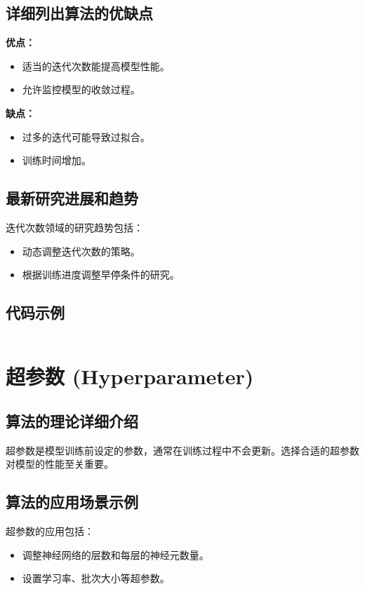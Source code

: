 \subsection*{详细列出算法的优缺点}
\textbf{优点：}
\begin{itemize}
    \item 适当的迭代次数能提高模型性能。
    \item 允许监控模型的收敛过程。
\end{itemize}

\textbf{缺点：}
\begin{itemize}
    \item 过多的迭代可能导致过拟合。
    \item 训练时间增加。
\end{itemize}

\subsection*{最新研究进展和趋势}
迭代次数领域的研究趋势包括：
\begin{itemize}
    \item 动态调整迭代次数的策略。
    \item 根据训练进度调整早停条件的研究。
\end{itemize}
\subsection*{代码示例}
\begin{lstlisting}

\end{lstlisting}


\section{超参数 (Hyperparameter)}
\subsection*{算法的理论详细介绍}
超参数是模型训练前设定的参数，通常在训练过程中不会更新。选择合适的超参数对模型的性能至关重要。

\subsection*{算法的应用场景示例}
超参数的应用包括：
\begin{itemize}
    \item 调整神经网络的层数和每层的神经元数量。
    \item 设置学习率、批次大小等超参数。
\end{itemize}

